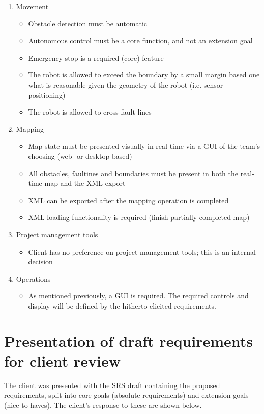 \documentclass[11pt, a4paper]{article}
\begin{document}
\begin{enumerate}
\item Movement
\begin{itemize}
\item Obstacle detection must be automatic
\item Autonomous control must be a core function, and not an extension goal
\item Emergency stop is a required (core) feature
\item The robot is allowed to exceed the boundary by a small margin based one what is reasonable given the geometry of the robot (i.e. sensor positioning)
\item The robot is allowed to cross fault lines

\end{itemize}
\item Mapping
\begin{itemize}
\item Map state must be presented visually in real-time via a GUI of the team's choosing (web- or desktop-based)
\item All obstacles, faultines and boundaries must be present in both the real-time map and the XML export
\item XML can be exported after the mapping operation is completed
\item XML loading functionality is required (finish partially completed map)

\end{itemize}

\item Project management tools
\begin{itemize}
\item Client has no preference on project management tools; this is an internal decision

\end{itemize}
\item Operations
\begin{itemize}
\item As mentioned previously, a GUI is required. The required controls and display will be defined by the hitherto elicited requirements.
\end{itemize}
\end{enumerate}

\section{Presentation of draft requirements for client review}
The client was presented with the SRS draft containing the proposed requirements, split into core goals (absolute requirements) and extension goals (nice-to-haves). The client's response to these are shown below.
\end{document}
